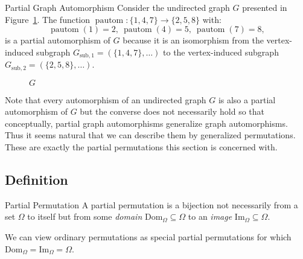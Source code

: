 \begin{exmp}{Partial Graph Automorphism}
  Consider the undirected graph $G$ presented in
  Figure~\ref{fig:partial_graph_automorphism}. The function $\operatorname{pautom}:
  \{1,4,7\} \rightarrow \{2,5,8\}$
  with:
  \begin{equation*}
    \operatorname{pautom}(1) = 2,\ 
    \operatorname{pautom}(4) = 5,\ 
    \operatorname{pautom}(7) = 8,
  \end{equation*}
  is a partial automorphism of $G$ because it is an isomorphism from the
  vertex-induced subgraph $G_{\mathrm{sub},1} = (\{1,4,7\},\dots)$ to the
  vertex-induced subgraph $G_{\mathrm{sub},2} = (\{2,5,8\},\dots)$.
  \begin{figure}[H]
    \centering
    \caption{$G$}
    \label{fig:partial_graph_automorphism}
  \end{figure}
\end{exmp}
%
Note that every automorphism of an undirected graph $G$ is also a partial
automorphism of $G$ but the converse does not necessarily hold so that
conceptually, partial graph automorphisms generalize graph automorphisms. Thus
it seems natural that we can describe them by generalized permutations. These
are exactly the partial permutations this section is concerned with.

\subsection{Definition}

\begin{defn}{Partial Permutation}
  A partial permutation is a bijection not necessarily from a set $\Omega$ to
  itself but from some \textit{domain} $\mathrm{Dom}_{\Omega} \subseteq \Omega$
  to an \textit{image} $\mathrm{Im}_{\Omega} \subseteq \Omega$.
\end{defn}
%
We can view ordinary permutations as special partial permutations for which
$\mathrm{Dom}_{\Omega} = \mathrm{Im}_{\Omega} = \Omega$.


